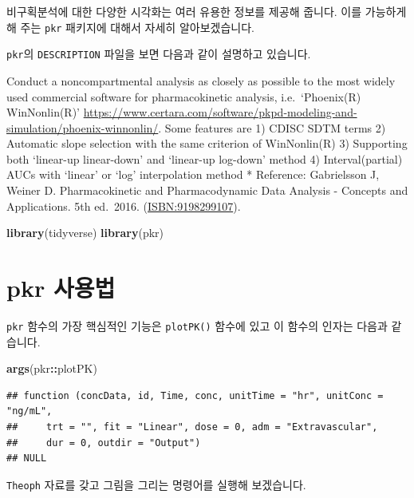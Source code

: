 \documentclass[
  10pt,
]{krantz}
\makeatletter
\newenvironment{Shaded}{\begin{snugshade}}{\end{snugshade}}
\newcommand{\KeywordTok}[1]{\textcolor[rgb]{0.13,0.29,0.53}{\textbf{#1}}}
\newcommand{\NormalTok}[1]{#1}
\newcommand{\OperatorTok}[1]{\textcolor[rgb]{0.81,0.36,0.00}{\textbf{#1}}}
\renewenvironment{quote}{\begin{VF}}{\end{VF}}
\newenvironment{kframe}{%
\medskip{}
\setlength{\fboxsep}{.8em}
 \def\at@end@of@kframe{}%
 \ifinner\ifhmode%
  \def\at@end@of@kframe{\end{minipage}}%
  \begin{minipage}{\columnwidth}%
 \fi\fi%
 \def\FrameCommand##1{\hskip\@totalleftmargin \hskip-\fboxsep
 \colorbox{shadecolor}{##1}\hskip-\fboxsep
     \hskip-\linewidth \hskip-\@totalleftmargin \hskip\columnwidth}%
 \MakeFramed {\advance\hsize-\width
   \@totalleftmargin\z@ \linewidth\hsize
   \@setminipage}}%
 {\par\unskip\endMakeFramed%
 \at@end@of@kframe}
\renewenvironment{Shaded}{\begin{kframe}}{\end{kframe}}
\makeatother
\begin{document}
비구획분석에 대한 다양한 시각화는 여러 유용한 정보를 제공해 줍니다. 이를 가능하게 해 주는 \texttt{pkr} 패키지\citep{R-pkr}에 대해서 자세히 알아보겠습니다.

\texttt{pkr}의 \texttt{DESCRIPTION} 파일을 보면 다음과 같이 설명하고 있습니다.

\begin{quote}
Conduct a noncompartmental analysis as closely as possible to the most widely used commercial software for pharmacokinetic analysis, i.e.~`Phoenix(R) WinNonlin(R)' \url{https://www.certara.com/software/pkpd-modeling-and-simulation/phoenix-winnonlin/}.
Some features are
1) CDISC SDTM terms
2) Automatic slope selection with the same criterion of WinNonlin(R)
3) Supporting both `linear-up linear-down' and `linear-up log-down' method
4) Interval(partial) AUCs with `linear' or `log' interpolation method
* Reference: Gabrielsson J, Weiner D. Pharmacokinetic and Pharmacodynamic Data Analysis - Concepts and Applications. 5th ed.~2016. (\url{ISBN:9198299107}).
\end{quote}

\begin{Shaded}
\begin{Highlighting}[]
\KeywordTok{library}\NormalTok{(tidyverse)}
\KeywordTok{library}\NormalTok{(pkr)}
\end{Highlighting}
\end{Shaded}

\hypertarget{pkr-manual}{%
\section{pkr 사용법}\label{pkr-manual}}

\texttt{pkr} 함수의 가장 핵심적인 기능은 \texttt{plotPK()} 함수에 있고 이 함수의 인자는 다음과 같습니다.

\begin{Shaded}
\begin{Highlighting}[]
\KeywordTok{args}\NormalTok{(pkr}\OperatorTok{::}\NormalTok{plotPK)}
\end{Highlighting}
\end{Shaded}

\begin{verbatim}
## function (concData, id, Time, conc, unitTime = "hr", unitConc = "ng/mL", 
##     trt = "", fit = "Linear", dose = 0, adm = "Extravascular", 
##     dur = 0, outdir = "Output") 
## NULL
\end{verbatim}

\texttt{Theoph} 자료를 갖고 그림을 그리는 명령어를 실행해 보겠습니다.
\end{document}
